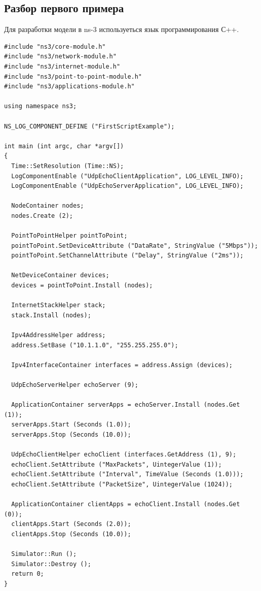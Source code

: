 \documentclass[14pt,a4paper]{article}
\begin{document}
\subsection{Разбор первого примера\cite{ns3Doc:website}} 
Для разработки модели в ns-3 используеться язык программирования С++.
\begin{verbatim}
#include "ns3/core-module.h"
#include "ns3/network-module.h"
#include "ns3/internet-module.h"
#include "ns3/point-to-point-module.h"
#include "ns3/applications-module.h"

using namespace ns3;

NS_LOG_COMPONENT_DEFINE ("FirstScriptExample");

int main (int argc, char *argv[])
{
  Time::SetResolution (Time::NS);
  LogComponentEnable ("UdpEchoClientApplication", LOG_LEVEL_INFO);
  LogComponentEnable ("UdpEchoServerApplication", LOG_LEVEL_INFO);

  NodeContainer nodes;
  nodes.Create (2);

  PointToPointHelper pointToPoint;
  pointToPoint.SetDeviceAttribute ("DataRate", StringValue ("5Mbps"));
  pointToPoint.SetChannelAttribute ("Delay", StringValue ("2ms"));

  NetDeviceContainer devices;
  devices = pointToPoint.Install (nodes);

  InternetStackHelper stack;
  stack.Install (nodes);

  Ipv4AddressHelper address;
  address.SetBase ("10.1.1.0", "255.255.255.0");

  Ipv4InterfaceContainer interfaces = address.Assign (devices);

  UdpEchoServerHelper echoServer (9);

  ApplicationContainer serverApps = echoServer.Install (nodes.Get (1));
  serverApps.Start (Seconds (1.0));
  serverApps.Stop (Seconds (10.0));

  UdpEchoClientHelper echoClient (interfaces.GetAddress (1), 9);
  echoClient.SetAttribute ("MaxPackets", UintegerValue (1));
  echoClient.SetAttribute ("Interval", TimeValue (Seconds (1.0)));
  echoClient.SetAttribute ("PacketSize", UintegerValue (1024));

  ApplicationContainer clientApps = echoClient.Install (nodes.Get (0));
  clientApps.Start (Seconds (2.0));
  clientApps.Stop (Seconds (10.0));

  Simulator::Run ();
  Simulator::Destroy ();
  return 0;
}

\end{verbatim} 
\end{document}
